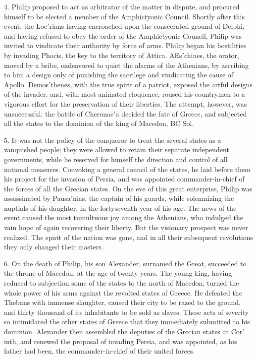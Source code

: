 \documentclass[openany,a4paper]{memoir}
\begin{document}
4. Philip proposed to act as arbitrator of the matter in 
dispute, and procured himself to be elected a member of the 
Amphictyonic Council. Shortly after this event, the Loc$'$rians 
having encroached upon the consecrated ground of Delphi, 
and having refused to obey the order of the Amphictyonic 
Council, Philip was invited to vindicate their authority by 
force of arms. Philip began his hostilities by invading 
Phocis, the key to the territory of Attica. AEs$'$chines, the 
orator, moved by a bribe, endeavored to quiet the alarms of 
the Athenians, by ascribing to him a design only of punishing the sacrilege and vindicating the cause of Apollo. Demos$'$thenes, with the true spirit of a patriot, exposed the 
artful designs of the invader, and, with most animated eloquence, roused his countrymen to a vigorous effort for the 
preservation of their liberties. The attempt, however, was 
unsuccessful; the battle of Cheronae$'$a decided the fate of 
Greece, and subjected all the states to the dominion of the 
king of Macedon, BC Sol. 

5. It was not the policy of the conqueror to treat the 
several states as a vanquished people; they were allowed to 
retain their separate independent governments, while he reserved for himself the direction and control of all national 
measures. Convoking a general council of the states, he 
laid before them his project for the invasion of Persia, and 
was appointed commander-in-chief of the forces of all the 
Grecian states. On the eve of this great enterprise, Philip 
was assassinated by Pausa$'$nias, the captain of his guards, 
while solemnizing the nuptials of his daughter, in the fortyseventh year of his age. The news of the event caused the 
most tumultuous joy among the Athenians, who indulged the 
vain hope of again recovering their liberty. But the visionary prospect was never realized. The spirit of the nation 
was gone, and in all their subsequent revolutions they only 
changed their masters. 

6. On the death of Philip, his son Alexander, surnamed 
the Great, succeeded to the throne of Macedon, at the age of 
twenty years. The young king, having reduced to subjection 
some of the states to the north of Macedon, turned the whole 
power of his arms against the revolted states of Greece. He 
defeated the Thebans with immense slaughter, caused their 
city to be razed to the ground, and thirty thousand of its inhabitants to be sold as slaves. These acts of severity so intimidated the other states of Greece that they immediately 
submitted to his dominion. Alexander then assembled the 
deputies of the Grecian states at Cor$'$inth, and renewed the 
proposal of invading Persia, and was appointed, as his father 
had been, the commander-in-chief of their united forces. 
\end{document}
